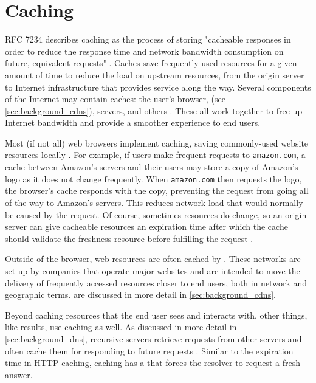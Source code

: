 \section{Caching}\label{sec:background_caching}

RFC 7234 describes caching as the process of storing "cacheable responses in order to reduce the response time and network bandwidth consumption on future, equivalent requests" \cite{rfc7234}. Caches save frequently-used resources for a given amount of time to reduce the load on upstream resources, from the origin server to Internet infrastructure that provides service along the way. Several components of the Internet may contain caches: the user's browser, \cdns (see \cref{sec:background_cdns}), \dns servers, and others \cite{MozillaFoundation2019HTTPCaching}. These all work together to free up Internet bandwidth and provide a smoother experience to end users.

Most (if not all) web browsers implement \http caching, saving commonly-used website resources locally \cite{Grigorik2019HTTPCaching}. For example, if users make frequent requests to \texttt{amazon.com}, a cache between Amazon's servers and their users may store a copy of Amazon's logo as it does not change frequently. When \texttt{amazon.com} then requests the logo, the browser's cache responds with the copy, preventing the request from going all of the way to Amazon's servers. This reduces network load that would normally be caused by the request. Of course, sometimes resources do change, so an origin server can give cacheable resources an expiration time after which the cache should validate the freshness resource before fulfilling the request \cite{rfc7234}. 

Outside of the browser, web resources are often cached by \cdns. These networks are set up by companies that operate major websites and are intended to move the delivery of frequently accessed resources closer to end users, both in network and geographic terms. \cdns are discussed in more detail in \cref{sec:background_cdns}.

Beyond caching resources that the end user sees and interacts with, other things, like \dns results, use caching as well. As discussed in more detail in \autoref{sec:background_dns}, recursive \dns servers retrieve requests from other \dns servers and often cache them for responding to future requests \cite{rfc1035}. Similar to the expiration time in HTTP caching, \dns caching has a \ttl that forces the \dns resolver to request a fresh answer.